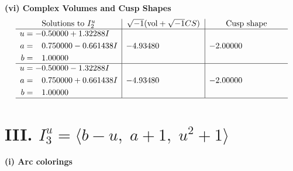 \documentclass[1p]{elsarticle_modified}
\theoremstyle{definition}
\newcommand{\I}{\sqrt{-1}}
\begin{document}
\newpage\flushleft \textbf{(vi) Complex Volumes and Cusp Shapes}
$$\begin{array}{c|c|c}  
\text{Solutions to }I^u_{2}& \I (\text{vol} + \sqrt{-1}CS) & \text{Cusp shape}\\
 \hline 
\begin{aligned}
u &= -0.50000 + 1.32288 I \\
a &= \phantom{-}0.750000 - 0.661438 I \\
b &= \phantom{-}1.00000\phantom{ +0.000000I}\end{aligned}
 & -4.93480\phantom{ +0.000000I} & -2.00000\phantom{ +0.000000I} \\ \hline\begin{aligned}
u &= -0.50000 - 1.32288 I \\
a &= \phantom{-}0.750000 + 0.661438 I \\
b &= \phantom{-}1.00000\phantom{ +0.000000I}\end{aligned}
 & -4.93480\phantom{ +0.000000I} & -2.00000\phantom{ +0.000000I}\\
 \hline 
 \end{array}$$\newpage\newpage\renewcommand{\arraystretch}{1}
\centering \section*{III. $I^u_{3}= \langle b- u,\;a+1,\;u^2+1 \rangle$}
\flushleft \textbf{(i) Arc colorings}\\
\end{document}
